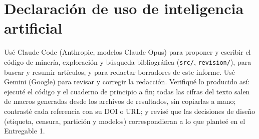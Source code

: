 \section*{Declaración de uso de inteligencia artificial}
{\footnotesize 
Usé Claude Code (Anthropic, modelos Claude Opus) para proponer y escribir el código de minería, exploración y búsqueda bibliográfica (\texttt{src/}, \texttt{revision/}), para buscar y resumir artículos, y para redactar borradores de este informe. Usé Gemini (Google) para revisar y corregir la redacción. Verifiqué lo producido así: ejecuté el código y el cuaderno de principio a fin; todas las cifras del texto salen de macros generadas desde los archivos de resultados, sin copiarlas a mano; contrasté cada referencia con su DOI o URL; y revisé que las decisiones de diseño (etiqueta, censura, partición y modelos) correspondieran a lo que planteé en el Entregable 1.}

